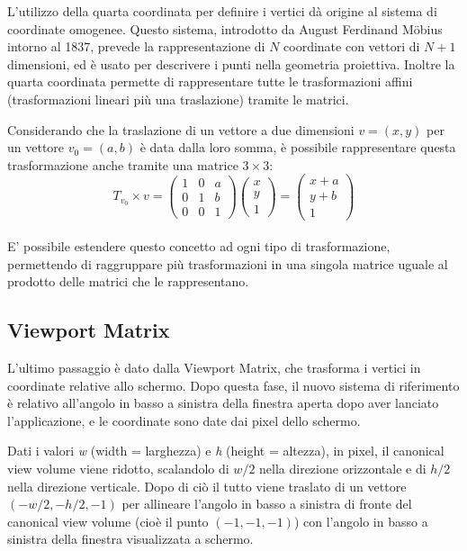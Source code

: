 L'utilizzo della quarta coordinata per definire i vertici dà origine al sistema di coordinate omogenee. Questo sistema, introdotto da August Ferdinand Möbius intorno al 1837, prevede la rappresentazione di $N$ coordinate con vettori di $N+1$ dimensioni, ed è usato per descrivere i punti nella geometria proiettiva. Inoltre la quarta coordinata permette di rappresentare tutte le trasformazioni affini (trasformazioni lineari più una traslazione) tramite le matrici.

Considerando che la traslazione di un vettore a due dimensioni $v = (x,y)$ per un vettore $v_0 = (a,b)$
è data dalla loro somma, è possibile rappresentare questa trasformazione anche tramite una matrice $3\times3$:
$$T_{v_0} \times v = \begin{pmatrix} 1 & 0 & a \\
0 & 1 & b \\
0 & 0 & 1
\end{pmatrix}
\begin{pmatrix}
x \\
y \\
1 
\end{pmatrix}
=
\begin{pmatrix}
x + a \\
y + b \\
1
\end{pmatrix}$$\\

E' possibile estendere questo concetto ad ogni tipo di trasformazione, permettendo di raggruppare più trasformazioni in una singola matrice uguale al prodotto delle matrici che le rappresentano.

\subsection{Viewport Matrix}
L'ultimo passaggio è dato dalla Viewport Matrix, che trasforma i vertici in coordinate relative allo schermo. Dopo questa fase, il nuovo sistema di riferimento è relativo all'angolo in basso a sinistra della finestra aperta dopo aver lanciato l'applicazione, e le coordinate sono date dai pixel dello schermo.

Dati i valori \textit{w} (width = larghezza) e \textit{h} (height = altezza), in pixel, il canonical view volume viene ridotto, scalandolo di $w/2$ nella direzione orizzontale e di $h/2$ nella direzione verticale. Dopo di ciò il tutto viene traslato di un vettore $(-w/2, -h/2, -1)$ per allineare l'angolo in basso a sinistra di fronte del canonical view volume (cioè il punto $(-1,-1,-1)$) con l'angolo in basso a sinistra della finestra visualizzata a schermo.

